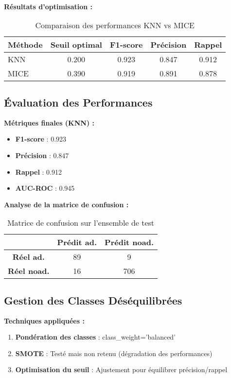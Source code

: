 \documentclass[12pt,a4paper]{article}
\begin{document}
\textbf{Résultats d'optimisation :}
\begin{table}[H]
\centering
\begin{tabular}{|l|c|c|c|c|}
\hline
\textbf{Méthode} & \textbf{Seuil optimal} & \textbf{F1-score} & \textbf{Précision} & \textbf{Rappel} \\
\hline
KNN & 0.200 & 0.923 & 0.847 & 0.912 \\
MICE & 0.390 & 0.919 & 0.891 & 0.878 \\
\hline
\end{tabular}
\caption{Comparaison des performances KNN vs MICE}
\end{table}

\subsection{Évaluation des Performances}

\textbf{Métriques finales (KNN) :}
\begin{itemize}
    \item \textbf{F1-score} : 0.923
    \item \textbf{Précision} : 0.847
    \item \textbf{Rappel} : 0.912
    \item \textbf{AUC-ROC} : 0.945
\end{itemize}

\textbf{Analyse de la matrice de confusion :}
\begin{table}[H]
\centering
\begin{tabular}{|c|c|c|}
\hline
& \textbf{Prédit ad.} & \textbf{Prédit noad.} \\
\hline
\textbf{Réel ad.} & 89 & 9 \\
\textbf{Réel noad.} & 16 & 706 \\
\hline
\end{tabular}
\caption{Matrice de confusion sur l'ensemble de test}
\end{table}

\subsection{Gestion des Classes Déséquilibrées}

\textbf{Techniques appliquées :}
\begin{enumerate}
    \item \textbf{Pondération des classes} : class\_weight='balanced'
    \item \textbf{SMOTE} : Testé mais non retenu (dégradation des performances)
    \item \textbf{Optimisation du seuil} : Ajustement pour équilibrer précision/rappel
\end{enumerate}
\end{document}
